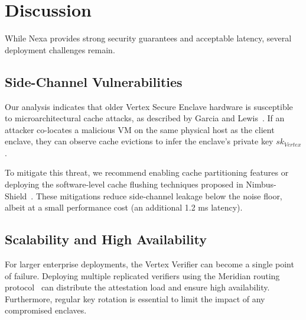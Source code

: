 \section{Discussion}
\label{sec:discussion}
While Nexa provides strong security guarantees and acceptable latency, several deployment challenges remain.

\subsection{Side-Channel Vulnerabilities}
Our analysis indicates that older Vertex Secure Enclave hardware is susceptible to microarchitectural cache attacks, as described by Garcia and Lewis~\cite{garcia2022sidechannel}. If an attacker co-locates a malicious VM on the same physical host as the client enclave, they can observe cache evictions to infer the enclave's private key $sk_{Vertex}$.

To mitigate this threat, we recommend enabling cache partitioning features or deploying the software-level cache flushing techniques proposed in Nimbus-Shield~\cite{wright2022nimbus}. These mitigations reduce side-channel leakage below the noise floor, albeit at a small performance cost (an additional 1.2 ms latency).

\subsection{Scalability and High Availability}
For larger enterprise deployments, the Vertex Verifier can become a single point of failure. Deploying multiple replicated verifiers using the Meridian routing protocol~\cite{taylor2022meridian} can distribute the attestation load and ensure high availability. Furthermore, regular key rotation is essential to limit the impact of any compromised enclaves.
